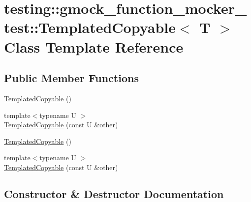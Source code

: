 \hypertarget{classtesting_1_1gmock__function__mocker__test_1_1_templated_copyable}{}\section{testing\+::gmock\+\_\+function\+\_\+mocker\+\_\+test\+::Templated\+Copyable$<$ T $>$ Class Template Reference}
\label{classtesting_1_1gmock__function__mocker__test_1_1_templated_copyable}
\subsection*{Public Member Functions}
\begin{DoxyCompactItemize}
\item 
\mbox{\hyperlink{classtesting_1_1gmock__function__mocker__test_1_1_templated_copyable_ad64971868d9751667ba26a2f60a07e15}{Templated\+Copyable}} ()
\item 
{\footnotesize template$<$typename U $>$ }\\\mbox{\hyperlink{classtesting_1_1gmock__function__mocker__test_1_1_templated_copyable_a8af561a4e372a9a41d4d3b9de6224b42}{Templated\+Copyable}} (const U \&other)
\item 
\mbox{\hyperlink{classtesting_1_1gmock__function__mocker__test_1_1_templated_copyable_ad64971868d9751667ba26a2f60a07e15}{Templated\+Copyable}} ()
\item 
{\footnotesize template$<$typename U $>$ }\\\mbox{\hyperlink{classtesting_1_1gmock__function__mocker__test_1_1_templated_copyable_a8af561a4e372a9a41d4d3b9de6224b42}{Templated\+Copyable}} (const U \&other)
\end{DoxyCompactItemize}


\subsection{Constructor \& Destructor Documentation}
\mbox{\label{classtesting_1_1gmock__function__mocker__test_1_1_templated_copyable_ad64971868d9751667ba26a2f60a07e15}} 
